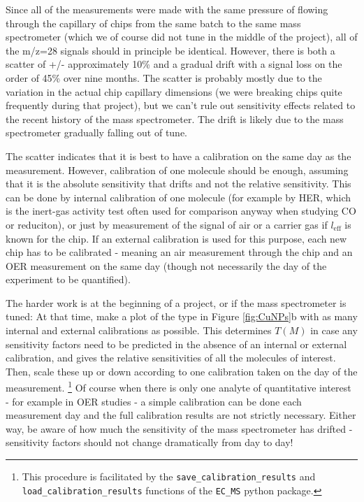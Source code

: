 Since all of the measurements were made with the same pressure of  flowing through the capillary of chips from the same batch to the same mass spectrometer (which we of course did not tune in the middle of the project), all of the m/z=28 signals should in principle be identical. However, there is both a scatter of +/- approximately 10\% and a gradual drift with a signal loss on the order of 45\% over nine months. The scatter is probably mostly due to the variation in the actual chip capillary dimensions (we were breaking chips quite frequently during that project), but we can't rule out sensitivity effects related to the recent history of the mass spectrometer. The drift is likely due to the mass spectrometer gradually falling out of tune. 

The scatter indicates that it is best to have a calibration on the same day as the measurement. However, calibration of one molecule should be enough, assuming that it is the absolute sensitivity that drifts and not the relative sensitivity. This can be done by internal calibration of one molecule (for example  by HER, which is the inert-gas activity test often used for comparison anyway when studying CO or  reduciton), or just by measurement of the signal of air or a carrier gas if $l_\text{eff}$ is known for the chip. If an external calibration is used for this purpose, each new chip has to be calibrated - meaning an air measurement through the chip and an OER measurement on the same day (though not necessarily the day of the experiment to be quantified).

The harder work is at the beginning of a project, or if the mass spectrometer is tuned: At that time, make a plot of the type in Figure \ref{fig:CuNPs}b with as many internal and external calibrations as possible. This determines $T(M)$ in case any sensitivity factors need to be predicted in the absence of an internal or external calibration, and gives the relative sensitivities of all the molecules of interest. Then, scale these up or down according to one calibration taken on the day of the measurement.
\footnote{This procedure is facilitated by the \texttt{save\_calibration\_results} and \texttt{load\_calibration\_results} functions of the \texttt{EC\_MS} python package.} 
Of course when there is only one analyte of quantitative interest - for example in OER studies - a simple calibration can be done each measurement day and the full calibration results are not strictly necessary. Either way, be aware of how much the sensitivity of the mass spectrometer has drifted - sensitivity factors should not change dramatically from day to day!

